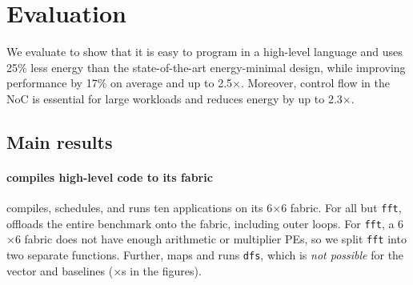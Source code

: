 \section{Evaluation}
\label{riptide:eval}

\figRipTideEnergyResults

\figRipTidePerformanceResults

We evaluate \riptide to show that it is easy to program in a high-level language
and uses 25\% less energy than the state-of-the-art energy-minimal design,
while improving performance by 17\% on average and up to 2.5$\times$.
Moreover, control flow in the NoC is essential for large
workloads and reduces energy by up to 2.3$\times$. %


\subsection{Main results}

\paragraph{\riptide compiles high-level code to its fabric} \riptide
compiles, schedules, and runs ten applications on its 6$\times$6 fabric.
% 
For all but {\tt fft}, \riptide offloads the entire benchmark onto the fabric, including
outer loops.
% 
For {\tt fft}, a 6$\times$6 fabric does not have enough arithmetic or multiplier PEs,
so we split {\tt fft} into two separate functions. %
% 
Further, \riptide maps and runs {\tt dfs}, which is {\em not possible} for
the vector and \snafu baselines ($\times$s in the figures).

